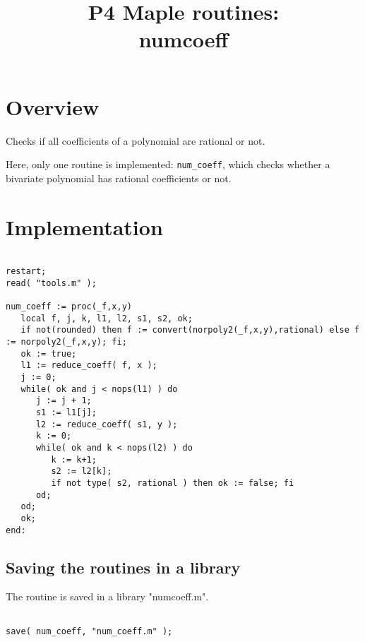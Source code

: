 \documentclass[a4paper,10pt]{article}
\title{P4 Maple routines:\\numcoeff}
\author{}
\date{}
\begin{document}
\maketitle

\section{Overview}

Checks if all coefficients of a polynomial are rational or not.

Here, only one routine is implemented: \verb+num_coeff+, which checks whether a bivariate polynomial
has rational coefficients or not.

\section{Implementation}

\begin{lstlisting}[name=numcoeff]

restart;
read( "tools.m" );

num_coeff := proc(_f,x,y)
   local f, j, k, l1, l2, s1, s2, ok;
   if not(rounded) then f := convert(norpoly2(_f,x,y),rational) else f := norpoly2(_f,x,y); fi;
   ok := true;
   l1 := reduce_coeff( f, x );
   j := 0;
   while( ok and j < nops(l1) ) do
      j := j + 1;
      s1 := l1[j];
      l2 := reduce_coeff( s1, y );
      k := 0;
      while( ok and k < nops(l2) ) do
         k := k+1;
         s2 := l2[k];
         if not type( s2, rational ) then ok := false; fi
      od;
   od;
   ok;
end:

\end{lstlisting}


\subsection{Saving the routines in a library}

The routine is saved in a library "numcoeff.m".

\begin{lstlisting}[name=gcd]

save( num_coeff, "num_coeff.m" );

\end{lstlisting}
\end{document}
